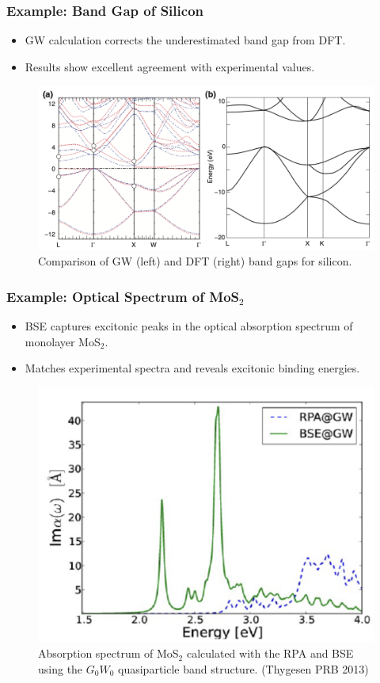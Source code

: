 \documentclass{CustomBeamer}
\begin{document}
        \begin{frame}
        \frametitle{Example: Band Gap of Silicon}
        \begin{itemize}
            \item GW calculation corrects the underestimated band gap from DFT.
            \item Results show excellent agreement with experimental values.
        \end{itemize}
        \begin{figure}
            \centering
            \includegraphics[width=0.7\linewidth]{gw_band_gap.png}
            \caption{Comparison of GW (left) and DFT (right) band gaps for silicon.}
        \end{figure}
        \end{frame}
        
        \begin{frame}
        \frametitle{Example: Optical Spectrum of MoS$_2$}
        \begin{itemize}
            \item BSE captures excitonic peaks in the optical absorption spectrum of monolayer MoS$_2$.
            \item Matches experimental spectra and reveals excitonic binding energies.
        \end{itemize}
        \begin{figure}
            \centering
            \includegraphics[width=0.4\linewidth]{bse_optical_spectrum.png}
            \caption{  Absorption spectrum of MoS$_2$ calculated with the RPA and BSE using the $G_0W_0$ quasiparticle band structure. (Thygesen PRB 2013)}
        \end{figure}
        \end{frame}
\end{document}
